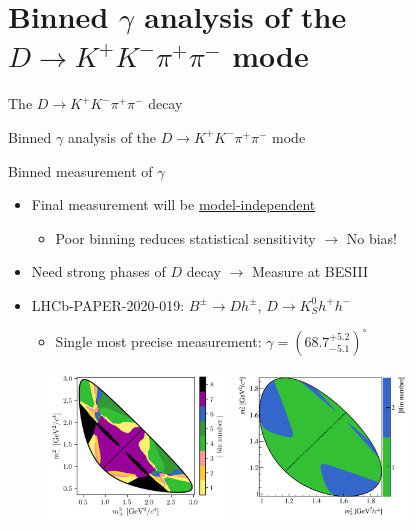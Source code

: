 \documentclass{beamer}
\begin{document}
\section{Binned \texorpdfstring{$\gamma$}{gamma} analysis of the \texorpdfstring{$D\to K^+K^-\pi^+\pi^-$}{D->KKpipi} mode}
\begin{frame}{The $D\to K^+K^-\pi^+\pi^-$ decay}
  \begin{center}
    {\huge Binned $\gamma$ analysis of the $D\to K^+K^-\pi^+\pi^-$ mode}
  \end{center}
\end{frame}

\begin{frame}{Binned measurement of $\gamma$}
  \begin{itemize}
    \setlength\itemsep{0.5em}
    \item{Final measurement will be \underline{model-independent}}
    \begin{itemize}
      \item{Poor binning reduces statistical sensitivity $\to$ No bias!}
    \end{itemize}
    \item{Need strong phases of $D$ decay $\to$ Measure at BESIII}
    \item{LHCb-PAPER-2020-019: $B^\pm\to Dh^\pm$, $D\to K_S^0 h^+h^-$}
    \begin{itemize}
      \item{Single most precise measurement: $\gamma = (68.7^{+5.2}_{-5.1})^\circ$}
    \end{itemize}
  \end{itemize}
  \begin{figure}
    \includegraphics[height = 4cm]{Plots/KsPiPi_optimal.png}
    \includegraphics[height = 4cm]{Plots/KsKK_binning.png}
  \end{figure}
\end{frame}
\end{document}
